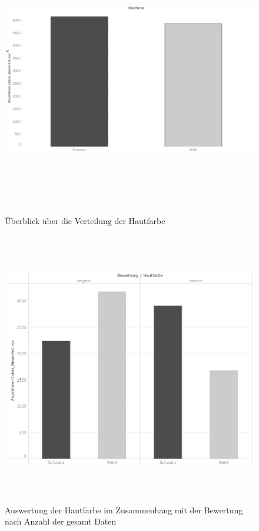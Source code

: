 \documentclass[a4paper,12pt]{report}
\begin{document}
\begin{figure}[!h]
    \centering
    \includegraphics[width=16cm,height=12cm]{Diagramme/SZ1_Tab2.PNG}
    \caption{Überblick über die Verteilung der Hautfarbe}
    \label{fig:SZ1Tab2}
\end{figure}

\begin{figure}[!h]
    \centering
    \includegraphics[width=16cm,height=12cm]{Diagramme/SZ1_Tab3.PNG}
    \caption{Auswertung der Hautfarbe im Zusammenhang mit der Bewertung nach Anzahl der gesamt Daten}
    \label{fig:SZ1Tab3}
\end{figure}
\end{document}
